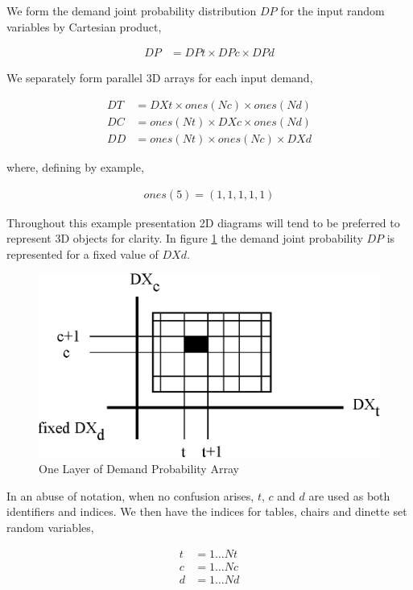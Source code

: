 We form the demand joint probability distribution $DP$ for the input random variables by Cartesian product,

\begin{align*}
DP &= DPt \times DPc \times DPd
\end{align*}

We separately form parallel 3D arrays for each input demand,

\begin{align*}
DT &= DXt \times ones(Nc) \times ones(Nd)\\
DC &= ones(Nt) \times DXc \times ones(Nd)\\
DD &= ones(Nt) \times ones(Nc) \times DXd
\end{align*}

where, defining by example,

\begin{align*}
ones(5) = (1, 1, 1, 1, 1)
\end{align*}

Throughout this example presentation 2D diagrams will tend to be preferred to represent 3D objects for clarity. In figure \ref{fig:tcd_rectangle} the demand joint probability $DP$ is represented for a fixed value of $DXd$.

\begin{figure}
  \centering
  \includegraphics{Images/tcd_rectangle}
  \caption[One Layer of Demand Probability Array]
          {One Layer of Demand Probability Array}
  \label{fig:tcd_rectangle}
\end{figure}

In an abuse of notation, when no confusion arises, $t$, $c$ and $d$ are used as both identifiers and indices. We then have the indices for tables, chairs and dinette set random variables,

\begin{align*}
t &= 1 \dots Nt\\
c &= 1 \dots Nc\\
d &= 1 \dots Nd
\end{align*}

